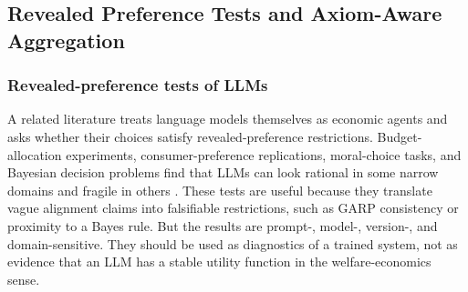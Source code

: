 \subsection{Revealed Preference Tests and Axiom-Aware Aggregation}
\label{sec:revealed_pref_axioms}

\subsubsection{Revealed-preference tests of LLMs}

A related literature treats language models themselves as economic agents and asks whether their choices satisfy revealed-preference restrictions. Budget-allocation experiments, consumer-preference replications, moral-choice tasks, and Bayesian decision problems find that LLMs can look rational in some narrow domains and fragile in others \citep{chen2023rationalitygpt,golisingh2024preferences,seror2024moral,murawatrawat2025bayesian}. These tests are useful because they translate vague alignment claims into falsifiable restrictions, such as GARP consistency or proximity to a Bayes rule. But the results are prompt-, model-, version-, and domain-sensitive. They should be used as diagnostics of a trained system, not as evidence that an LLM has a stable utility function in the welfare-economics sense.

